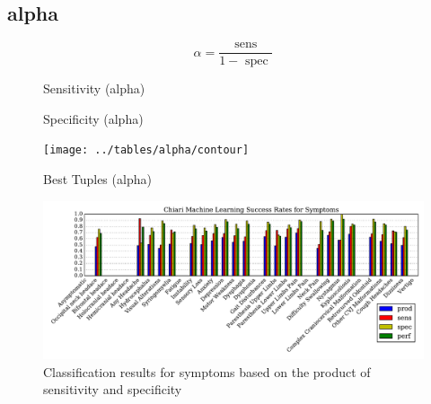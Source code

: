 \documentclass[10pt]{article}
\newcommand{\sens}{\mbox{ sens }}
\newcommand{\spec}{\mbox{ spec }}
\begin{document}
\pagebreak
\subsection{alpha}
\vspace{1em}
\begin{equation}
	\alpha = \frac{\sens}{1-\spec}
\end{equation}
\vspace{1em}

\begin{multicols}{2}
	\begin{figure}[H]
		\center
		
		\caption{Sensitivity (alpha)}
	\end{figure}

	\begin{figure}[H]
		\center
		
		\caption{Specificity (alpha)}
	\end{figure}
	
	\begin{figure}[H]
		\texttt{[image: ../tables/alpha/contour]}
	\end{figure}
\end{multicols}

\vspace{2em}

\begin{figure}[H]
	\center
	
	\caption{Best Tuples (alpha)}
\end{figure}




\begin{figure}[H]
    \centering
    \includegraphics[width=\textwidth]{symptom_success_plot.pdf}
    
	\caption{Classification results for symptoms based on the product of sensitivity and specificity}
\end{figure}

\pagebreak


\end{document}

